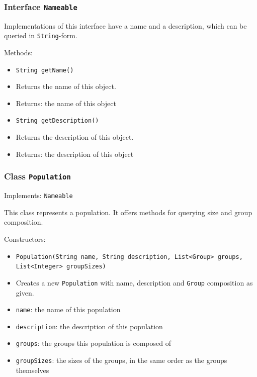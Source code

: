 \documentclass[parskip=full,11pt]{scrartcl}
\begin{document}
\subsubsection{Interface \texttt{Nameable}}

Implementations of this interface have a name and a description, which can be queried in \texttt {String}-form.

Methods:
\begin{itemize}\itemsep -10pt
\item \texttt{String getName()}
\item[] Returns the name of this object.
\item[] Returns: the name of this object

\item \texttt{String getDescription()}
\item[] Returns the description of this object.
\item[] Returns: the description of this object
\end{itemize}

\subsubsection{Class \texttt{Population}}
Implements: \texttt{Nameable}

This class represents a population. It offers methods for querying size and group composition.

Constructors:
\begin{itemize}\itemsep -10pt
\item \texttt{Population(String name, String description, List<Group> groups, List<Integer> groupSizes)}
\item[] Creates a new \texttt{Population} with name, description and \texttt{Group} composition as given.
\item[] \texttt{name}: the name of this population
\item[] \texttt{description}: the description of this population
\item[] \texttt{groups}: the groups this population is composed of
\item[] \texttt{groupSizes}: the sizes of the groups, in the same order as the groups themselves
\end{itemize}
\end{document}
